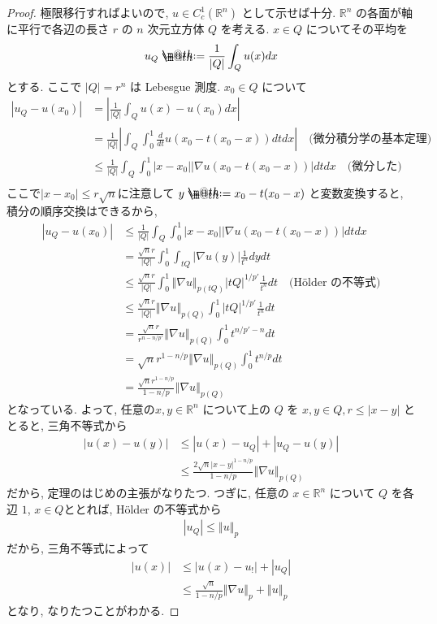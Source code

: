 \documentclass[openany, a4paper, oneside]{book}
\makeatletter
\newcommand*{\defeq}{\mathrel{\rlap{%
\raisebox{0.3ex}{$\m@th\cdot$}}%
\raisebox{-0.3ex}{$\m@th\cdot$}}%
=}
\theoremstyle{break}
\theoremstyle{breakdefn}
\newcommand{\abs}[1]{\left|#1\right|}
\newcommand{\norm}[1]{\left\Vert#1\right\Vert}
\newcommand{\bbR}{\mathbb{R}}
\makeatother
\begin{document}
\begin{proof}
極限移行すればよいので, $u \in C_c^1 (\bbR^n)$ として示せば十分.
$\bbR^n$ の各面が軸に平行で各辺の長さ $r$ の $n$ 次元立方体 $Q$ を考える.
$x \in Q$ についてその平均を
\begin{align}
 u_Q
 \defeq
 \frac{1}{|Q|} \int_Q u (x) dx
\end{align}
とする.
ここで $\abs{Q} = r^n$ は Lebesgue 測度.
$x_0 \in Q$ について
\begin{align}
 \abs{u_Q - u(x_0)}
 &=
 \abs{\frac{1}{|Q|} \int_Q u (x) - u (x_0) dx} \\
 &=
 \frac{1}{|Q|} \abs{\int_Q \int_0^1 \frac{d}{dt} u (x_0 - t (x_0 - x)) dt dx} \quad \text{(微分積分学の基本定理)} \\
 &\le
 \frac{1}{|Q|} \int_Q \int_0^1 \abs{x - x_0} \abs{\nabla u (x_0 - t (x_0 - x))} dt dx \quad \text{(微分した)} \\
\end{align}
ここで$\abs{x - x_0} \le r \sqrt{n}$に注意して $y \defeq x_0 - t (x_0 - x)$ と変数変換すると,
積分の順序交換はできるから,
\begin{align}
 \abs{u_Q - u(x_0)}
 &\le
 \frac{1}{|Q|} \int_Q \int_0^1 \abs{x - x_0} \abs{\nabla u (x_0 - t (x_0 - x))} dt dx \\
 &=
 \frac{\sqrt{n} r}{|Q|} \int_0^1 \int_{tQ} \abs{\nabla u (y)} \frac{1}{t^n} dy dt \\
 &\le
 \frac{\sqrt{n} r}{|Q|} \int_0^1 \norm{\nabla u}_{p (tQ)} \abs{tQ}^{1/{p'}} \frac{1}{t^n} dt \quad \text{(H\"older の不等式)} \\
 &\le
 \frac{\sqrt{n} r}{|Q|} \norm{\nabla u}_{p (Q)} \int_0^1 \abs{tQ}^{1/{p'}} \frac{1}{t^n} dt \\
 &=
 \frac{\sqrt{n} r}{r^{n-n/{p'}}} \norm{\nabla u}_{p (Q)} \int_0^1 t^{n/{p'} - n} dt \\
 &=
 \sqrt{n} r^{1 - n/p} \norm{\nabla u}_{p (Q)} \int_0^1 t^{n/p} dt \\
 &=
 \frac{\sqrt{n} r^{1 - n/p}}{1 - n/p} \norm{\nabla u}_{p (Q)}
\end{align}
となっている.
よって, 任意の$x, y \in \bbR^n$ について上の $Q$ を $x, y \in Q, r \le \abs{x-y}$ ととると,
三角不等式から
\begin{align}
 \abs{u (x) - u (y)}
 &\le
 \abs{u (x) - u_Q} + \abs{u_Q - u (y)} \\
 &\le
 \frac{2\sqrt{n} \abs{x-y}^{1 - n/p}}{1 - n/p} \norm{\nabla u}_{p (Q)}
\end{align}
だから, 定理のはじめの主張がなりたつ.
つぎに, 任意の $x \in \bbR^n$ について $Q$ を各辺 $1$, $x \in Q$ととれば,
H\"older の不等式から
\begin{align}
 \abs{u_Q}
 \le
 \norm{u}_p
\end{align}
だから, 三角不等式によって
\begin{align}
 \abs{u(x)}
 &\le
 \abs{u(x)- u_!} + \abs{u_Q} \\
 &\le
 \frac{\sqrt{n}}{1 - n/p} \norm{\nabla u}_p + \norm{u}_p
\end{align}
となり, なりたつことがわかる.
\end{proof}
\end{document}
